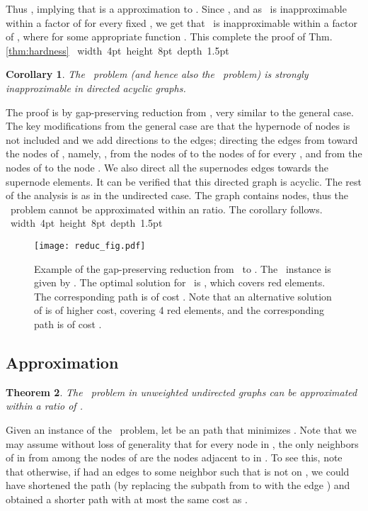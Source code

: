 \documentclass[12pt]{article}
\newtheorem{theorem}{Theorem}[section]
\newtheorem{corollary}[theorem]{Corollary}
\def\Proof{\par\noindent{\bf Proof:~}}
\def\blackslug{\hbox{\hskip 1pt \vrule width 4pt height 8pt
    depth 1.5pt \hskip 1pt}}
\def\QED{\quad\blackslug\lower 8.5pt\null\par}
\newcommand{\PS}[0]{ 
}
\newcommand{\PP}[0]{ }
\newcommand{\RBSC}[0]{  }
\begin{document}
Thus , implying that
 is a  approximation to \RBSC. Since , and as \RBSC\ is inapproximable within a factor of  for every fixed , we get that \PP\ is inapproximable within a factor of , where  for some appropriate function .
This complete the proof of Thm. \ref{thm:hardness}
\QED
\begin{corollary}
\label{cor:dag}
The \PP\ problem (and hence also the \PS\ problem) is strongly inapproximable in directed acyclic graphs.
\end{corollary}
\Proof
The proof is by gap-preserving reduction from \RBSC, very similar to the general case. The  key modifications from the general case are that the hypernode of  nodes is not included and we add directions to the edges; directing the edges from  toward the nodes of , namely, , from the nodes of  to the nodes of  for every , and from the nodes of  to the node . We also direct all the supernodes edges towards the supernode elements. It can be verified that this directed graph is acyclic. The rest of the analysis is as in the undirected case. The graph  contains  nodes, thus the \PP\ problem cannot be approximated within an  ratio. The corollary follows.
\QED
\begin{figure}[h!]
\begin{center}
\texttt{[image: reduc\_fig.pdf]}
\caption{ \label{fig:hardness}
\sf
Example of the gap-preserving reduction from \RBSC\ to \PP.
The \RBSC\ instance is given by .  The optimal solution for \RBSC\ is , which covers  red elements. The corresponding  path is of cost . Note that an alternative solution of  is of higher cost, covering 4 red elements, and the corresponding  path is of cost .
}
\end{center}
\end{figure}

\subsection{Approximation}
\begin{theorem}
\label{thm:delta_approx}
The \PP\ problem in unweighted undirected graphs can be approximated within a ratio of .
\end{theorem}
\Proof
Given an instance of the \PP\ problem, let  be an  path that minimizes . Note that we may assume without loss of generality that for every node  in , the only neighbors of  in  from among the nodes of  are the nodes adjacent to  in . To see this, note that otherwise, if  had an edges to some neighbor  such that  is not on , we could have shortened the path  (by replacing the subpath from  to  with the edge ) and obtained a shorter path with at most the same cost as .
\end{document}
